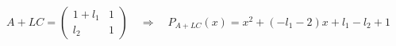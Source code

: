 \documentclass{article}
\begin{document}
\thispagestyle{empty}

$$
A+LC=\begin{pmatrix} 1+l_1 & 1 \\ l_2 & 1\end{pmatrix} \quad \Rightarrow \quad P_{A+LC}(x) = x^2 + (-l_1-2)x + l_1 -l_2 +1
$$
\end{document}
